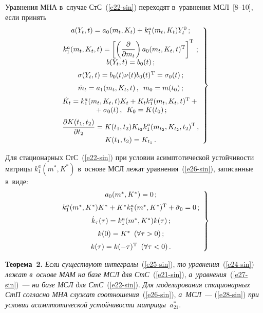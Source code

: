\begin{multicols}{2}
Уравнения МНА в~случае СтС~(\ref{e22-sin}) переходят в~уравнения 
МСЛ~[8--10], если принять
 \begin{equation}
 \left.
 \hspace*{-2mm}\begin{array}{c}
    a(Y_t,t) = a_0 (m_t, K_t) + k_1^a (m_t, K_t) Y_t^0\,;
   \\[6pt]
    k_1^a (m_t, K_t, t) =\lk \left(\fr{\prt}{\prt m_t} \right)
    a_0 (m_t, K_t, t)^{\mathrm{T}}\rk^{\mathrm{T}}\,;
\\[6pt]
    b(Y_t,t) = b_0 (t)\,;
    \\[6pt]
    \si(Y_t, t)= b_0(t) \nu(t) b_0(t)^{\mathrm{T}} = \si_0(t)\,;
   \\[6pt]
    \dot m_t = a_1 (m_t, K_t, t)\,,\enskip m_0 = m(t_0)\,;
    \\[6pt]
    \dot K_t = k_1^a (m_t, K_t, t) K_t + K_t k_1^a (m_t, K_t, t)^{\mathrm{T}} +{}\\
    {}+     \si_0(t)\,,\enskip 
    K_0 = K(t_0)\,;\\[6pt]
    \fr{\prt K(t_1, t_2)}{\prt t_2} = K(t_1, t_2) K_{t_2} k_1^a (m_{t_2}, 
    K_{t_2}, t_2)^{\mathrm{T}}\,,\\[6pt]
     K(t_1, t_2) = K_{t_1}\,.
     \end{array}
     \right\}\!\!
    \label{e27-sin}
    \end{equation}

Для стационарных СтС~(\ref{e22-sin}) при условии асимптотической устойчивости 
матрицы $k_1^a (m^*, K^*)$ в~основе МСЛ лежат уравнения~(\ref{e26-sin}), 
записанные в~виде:
    \begin{equation}
    \left.
    \hspace*{-2mm}\begin{array}{c}
    a_0 (m^*, K^*) =0\,; \\[6pt]
     k_1^a ( m^*,  K^*)  K^* +  
    K^* k_1^a ( m^*,  K^*)^{\mathrm{T}} +\bar \si_0 =0\,;
\\[6pt]
\dot k_\tau (\tau) = k_1^a ( m^*, K^*)k(\tau)\,;\\[6pt]
k(0) =K^* \enskip (\forall \tau >0)\,;\\[6pt] 
k(\tau) = k (-\tau)^{\mathrm{T}} \enskip (\forall \tau <0)\,.
\end{array}
\right\}\!\!
\label{e28-sin}
\end{equation}

\noindent
\textbf{Теорема~2.} \textit{Если существуют интегралы}~(\ref{e25-sin}), 
\textit{то уравнения}~(\ref{e24-sin}) \textit{лежат в~основе МАМ на базе МСЛ для 
СтС}~(\ref{e21-sin}), \textit{а~уравнения}~(\ref{e27-sin})~--- 
\textit{на базе МСЛ для СтС}~(\ref{e22-sin}). 
\textit{Для моделирования стационарных СтП согласно МНА служат соотношения}~(\ref{e26-sin}), 
\textit{а~МСЛ}~--- (\ref{e28-sin}) 
\textit{при условии асимптотической устойчивости мат\-ри\-цы~$a_{21}^*$}.


\end{multicols}
